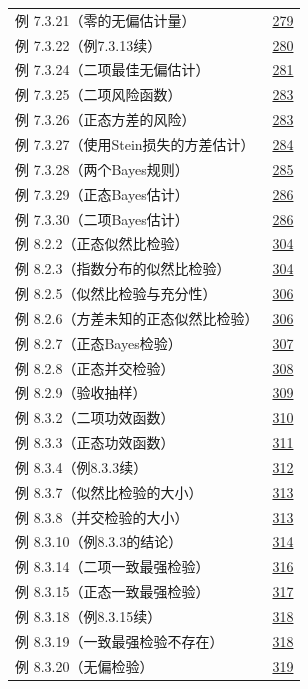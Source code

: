 \begin{longtable}{@{}p{}r@{}}
例 7.3.21（零的无偏估计量） & \hyperref[ex:7.3.21]{279} \\
例 7.3.22（例7.3.13续） & \hyperref[ex:7.3.22]{280} \\
例 7.3.24（二项最佳无偏估计） & \hyperref[ex:7.3.24]{281} \\
例 7.3.25（二项风险函数） & \hyperref[ex:7.3.25]{283} \\
例 7.3.26（正态方差的风险） & \hyperref[ex:7.3.26]{283} \\
例 7.3.27（使用Stein损失的方差估计） & \hyperref[ex:7.3.27]{284} \\
例 7.3.28（两个Bayes规则） & \hyperref[ex:7.3.28]{285} \\
例 7.3.29（正态Bayes估计） & \hyperref[ex:7.3.29]{286} \\
例 7.3.30（二项Bayes估计） & \hyperref[ex:7.3.30]{286} \\
\addlinespace[.5em]
例 8.2.2（正态似然比检验） & \hyperref[ex:8.2.2]{304} \\
例 8.2.3（指数分布的似然比检验） & \hyperref[ex:8.2.3]{304} \\
例 8.2.5（似然比检验与充分性） & \hyperref[ex:8.2.5]{306} \\
例 8.2.6（方差未知的正态似然比检验） & \hyperref[ex:8.2.6]{306} \\
例 8.2.7（正态Bayes检验） & \hyperref[ex:8.2.7]{307} \\
例 8.2.8（正态并交检验） & \hyperref[ex:8.2.8]{308} \\
例 8.2.9（验收抽样） & \hyperref[ex:8.2.9]{309} \\
例 8.3.2（二项功效函数） & \hyperref[ex:8.3.2]{310} \\
例 8.3.3（正态功效函数） & \hyperref[ex:8.3.3]{311} \\
例 8.3.4（例8.3.3续） & \hyperref[ex:8.3.4]{312} \\
例 8.3.7（似然比检验的大小） & \hyperref[ex:8.3.7]{313} \\
例 8.3.8（并交检验的大小） & \hyperref[ex:8.3.8]{313} \\
例 8.3.10（例8.3.3的结论） & \hyperref[ex:8.3.10]{314} \\
例 8.3.14（二项一致最强检验） & \hyperref[ex:8.3.14]{316} \\
例 8.3.15（正态一致最强检验） & \hyperref[ex:8.3.15]{317} \\
例 8.3.18（例8.3.15续） & \hyperref[ex:8.3.18]{318} \\
例 8.3.19（一致最强检验不存在） & \hyperref[ex:8.3.19]{318} \\
例 8.3.20（无偏检验） & \hyperref[ex:8.3.20]{319} \\

\end{longtable}
